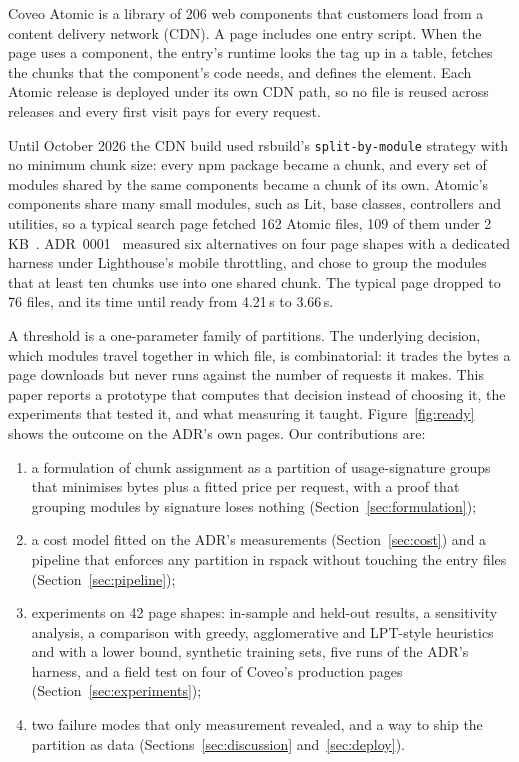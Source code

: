 \documentclass[11pt]{article}
\newcommand{\code}[1]{\texttt{#1}}
\begin{document}
Coveo Atomic is a library of 206 web components that customers load from a content delivery network (CDN). A page includes one entry script. When the page uses a component, the entry's runtime looks the tag up in a table, fetches the chunks that the component's code needs, and defines the element. Each Atomic release is deployed under its own CDN path, so no file is reused across releases and every first visit pays for every request.

Until October 2026 the CDN build used rsbuild's \code{split-by-module} strategy with no minimum chunk size: every npm package became a chunk, and every set of modules shared by the same components became a chunk of its own. Atomic's components share many small modules, such as Lit, base classes, controllers and utilities, so a typical search page fetched 162 Atomic files, 109 of them under 2\,KB~\cite{adr0001}. ADR~0001~\cite{adr0001} measured six alternatives on four page shapes with a dedicated harness under Lighthouse's mobile throttling, and chose to group the modules that at least ten chunks use into one shared chunk. The typical page dropped to 76 files, and its time until ready from 4.21\,s to 3.66\,s.

A threshold is a one-parameter family of partitions. The underlying decision, which modules travel together in which file, is combinatorial: it trades the bytes a page downloads but never runs against the number of requests it makes. This paper reports a prototype that computes that decision instead of choosing it, the experiments that tested it, and what measuring it taught. Figure~\ref{fig:ready} shows the outcome on the ADR's own pages. Our contributions are:
\begin{enumerate}
\item a formulation of chunk assignment as a partition of usage-signature groups that minimises bytes plus a fitted price per request, with a proof that grouping modules by signature loses nothing (Section~\ref{sec:formulation});
\item a cost model fitted on the ADR's measurements (Section~\ref{sec:cost}) and a pipeline that enforces any partition in rspack without touching the entry files (Section~\ref{sec:pipeline});
\item experiments on 42 page shapes: in-sample and held-out results, a sensitivity analysis, a comparison with greedy, agglomerative and LPT-style heuristics and with a lower bound, synthetic training sets, five runs of the ADR's harness, and a field test on four of Coveo's production pages (Section~\ref{sec:experiments});
\item two failure modes that only measurement revealed, and a way to ship the partition as data (Sections~\ref{sec:discussion} and~\ref{sec:deploy}).
\end{enumerate}
\end{document}

